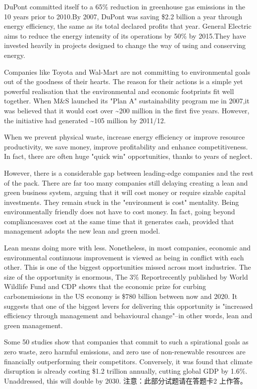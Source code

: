 \documentclass[UTF8,11pt]{ctexart}
\begin{document}
DuPont committed itself to a 65\% reduction in greenhouse gas emissions in the 10 years prior to 2010.By 2007, DuPont was saving \$2.2 billion a year through energy efficiency, the same as its total declared profits that year. General Electric aims to reduce the energy intensity of its operations by 50\% by 2015.They have invested heavily in projects designed to change the way of using and conserving energy.


Companies like Toyota and Wal-Mart are not committing to environmental goals out of the goodness of their hearts. The reason for their actions is a simple yet powerful realisation that the environmental and economic footprints fit well together. When M\&S launched its "Plan A" sustainability program me in 2007,it was believed that it would cost over \textasciitilde{}200 million in the first five years. However, the initiative had generated \textasciitilde{}105 million by 2011/12.


When we prevent physical waste, increase energy efficiency or improve resource productivity, we save money, improve profitability and enhance competitiveness. In fact, there are often huge "quick win" opportunities, thanks to years of neglect.


However, there is a considerable gap between leading-edge companies and the rest of the pack. There are far too many companies still delaying creating a lean and green business system, arguing that it will cost money or require sizable capital investments. They remain stuck in the "environment is cost" mentality. Being environmentally friendly does not have to cost money. In fact, going beyond compliancesaves cost at the same time that it generates cash, provided that management adopts the new lean and green model.


Lean means doing more with less. Nonetheless, in most companies, economic and environmental continuous improvement is viewed as being in conflict with each other. This is one of the biggest opportunities missed across most industries. The size of the opportunity is enormous, The 3\% Reportrecently published by World Wildlife Fund and CDP shows that the economic prize for curbing carbonemissions in the US economy is \$780 billion between now and 2020. It suggests that one of the biggest levers for delivering this opportunity is "increased efficiency through management and behavioural change"--in other words, lean and green management.


Some 50 studies show that companies that commit to such a spirational goals as zero waste, zero harmful emissions, and zero use of non-renewable resources are financially outperforming their competitors. Conversely, it was found that climate disruption is already costing \$1.2 trillion annually, cutting global GDP by 1.6\%. Unaddressed, this will double by 2030. 注意：此部分试题请在答题卡2 上作答。
\end{document}
